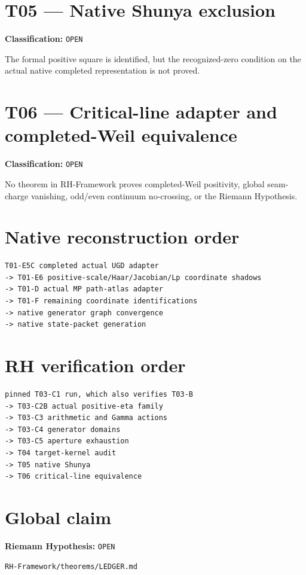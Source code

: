\hypertarget{t05-native-shunya-exclusion}{%
\section{T05 --- Native Shunya exclusion}\label{t05-native-shunya-exclusion}}

\textbf{Classification:} \texttt{OPEN}

The formal positive square is identified, but the recognized-zero condition on
the actual native completed representation is not proved.

\hypertarget{t06-critical-line-adapter-and-completed-weil-equivalence}{%
\section{T06 --- Critical-line adapter and completed-Weil equivalence}\label{t06-critical-line-adapter-and-completed-weil-equivalence}}

\textbf{Classification:} \texttt{OPEN}

No theorem in RH-Framework proves completed-Weil positivity, global seam-charge
vanishing, odd/even continuum no-crossing, or the Riemann Hypothesis.

\hypertarget{native-reconstruction-order}{%
\section{Native reconstruction order}\label{native-reconstruction-order}}

\begin{verbatim}
T01-E5C completed actual UGD adapter
-> T01-E6 positive-scale/Haar/Jacobian/Lp coordinate shadows
-> T01-D actual MP path-atlas adapter
-> T01-F remaining coordinate identifications
-> native generator graph convergence
-> native state-packet generation
\end{verbatim}

\hypertarget{rh-verification-order}{%
\section{RH verification order}\label{rh-verification-order}}

\begin{verbatim}
pinned T03-C1 run, which also verifies T03-B
-> T03-C2B actual positive-eta family
-> T03-C3 arithmetic and Gamma actions
-> T03-C4 generator domains
-> T03-C5 aperture exhaustion
-> T04 target-kernel audit
-> T05 native Shunya
-> T06 critical-line equivalence
\end{verbatim}

\hypertarget{global-claim}{%
\section{Global claim}\label{global-claim}}

\textbf{Riemann Hypothesis:} \texttt{OPEN}

\begin{flushright}\small\texttt{RH-Framework/theorems/LEDGER.md}\end{flushright}
